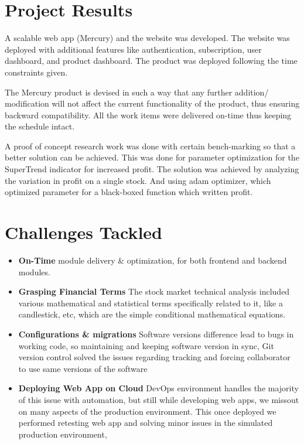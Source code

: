 \section{Project Results}
A scalable web app (Mercury) and the website was developed. The website was deployed with additional features like authentication, subscription, user dashboard, and product dashboard. The product was deployed following the time constraints given.

The Mercury product is devised in such a way that any further addition/ modification will not affect the current functionality of the product, thus ensuring backward compatibility. All the work items were delivered on-time thus keeping the schedule intact. 

A proof of concept research work was done with certain bench-marking so that a better solution can be achieved. This was done for parameter optimization for the SuperTrend indicator for increased profit. The solution was achieved by analyzing the variation in profit on a single stock. And using adam optimizer, which optimized parameter for a black-boxed function which written profit.

\section{Challenges Tackled}
\begin{itemize}
    \item \textbf{On-Time} module delivery \& optimization, for both frontend and backend modules.
    
    \item \textbf{Grasping Financial Terms} The stock market technical analysis included various mathematical and statistical terms specifically related to it, like a candlestick, etc, which are the simple conditional mathematical equations.
    \item \textbf{Configurations \& migrations} Software versions difference lead to bugs in working code, so maintaining and keeping software version in sync, Git version control  solved the issues regarding tracking and forcing collaborator to use same versions of the software
  \item \textbf{Deploying Web App on Cloud} DevOps environment handles the majority of this issue with automation, but still while developing web apps, we missout on many aspects of the production environment. This once deployed we performed retesting web app and solving minor issues in the simulated production environment,

\end{itemize} 
